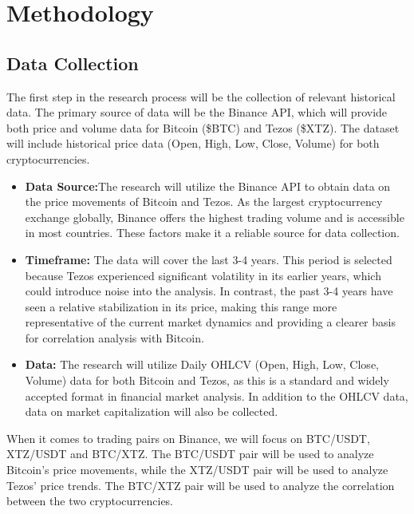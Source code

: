 
\section{Methodology}%
\label{sec:methodologie}

\subsection{Data Collection}

The first step in the research process will be the collection of relevant historical data. The primary source of data will be the Binance API, which will provide both price and volume data for Bitcoin (\$BTC) and Tezos (\$XTZ). The dataset will include historical price data (Open, High, Low, Close, Volume) for both cryptocurrencies.

\begin{itemize}
  \item \textbf{Data Source:}The research will utilize the Binance API to obtain data on the price movements of Bitcoin and Tezos. As the largest cryptocurrency exchange globally, Binance offers the highest trading volume and is accessible in most countries. These factors make it a reliable source for data collection.
  \item \textbf{Timeframe:} The data will cover the last 3-4 years. This period is selected because Tezos experienced significant volatility in its earlier years, which could introduce noise into the analysis. In contrast, the past 3-4 years have seen a relative stabilization in its price, making this range more representative of the current market dynamics and providing a clearer basis for correlation analysis with Bitcoin.
  \item \textbf{Data:} The research will utilize Daily OHLCV (Open, High, Low, Close, Volume) data for both Bitcoin and Tezos, as this is a standard and widely accepted format in financial market analysis. In addition to the OHLCV data, data on market capitalization will also be collected.
\end{itemize}
When it comes to trading pairs on Binance, we will focus on BTC/USDT, XTZ/USDT and BTC/XTZ. The BTC/USDT pair will be used to analyze Bitcoin's price movements, while the XTZ/USDT pair will be used to analyze Tezos' price trends. The BTC/XTZ pair will be used to analyze the correlation between the two cryptocurrencies.

